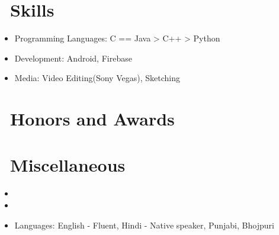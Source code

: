 \documentclass{resume}
\begin{document}
\section{\faCogs\ Skills}
\begin{itemize}[parsep=0.5ex]
  \item Programming Languages: C == Java > C++ > Python
  \item Development: Android, Firebase
  \item Media: Video Editing(Sony Vegas), Sketching 
\end{itemize}

\section{\faTrophy\ Honors and Awards}

\section{\faInfo\ Miscellaneous}
\begin{itemize}[parsep=0.5ex]
  \item {}
  \item {}
  \item Languages: English - Fluent, Hindi - Native speaker, Punjabi, Bhojpuri
\end{itemize}

%
%
\end{document}
